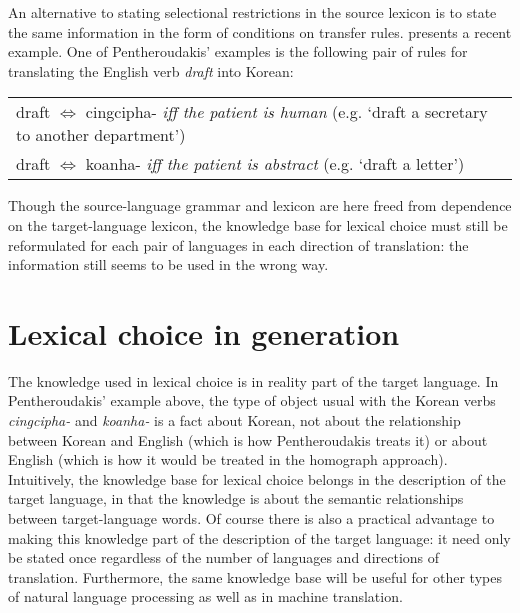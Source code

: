 An alternative to stating selectional restrictions in the source lexicon is
to state the same information in the form of conditions on transfer rules.
\cite{pentheroudakis:90:a} presents a recent example.
One of Pentheroudakis'
examples is the following pair of rules for translating the English verb
{\it draft\/} into Korean:
\begin{flushleft}
  \quad
  \small
  \begin{tabular}{l}
    draft $\Leftrightarrow$ cingcipha- {\it iff the patient is human\/}
    (e.g. `draft a secretary to another department')\\
    draft $\Leftrightarrow$ koanha- {\it iff the patient is abstract\/}
    (e.g. `draft a letter')\\
  \end{tabular}
\end{flushleft}
Though the source-language grammar and lexicon are here freed from dependence
on the target-language lexicon, the knowledge base for lexical choice must
still be reformulated for each pair of languages in each direction of
translation: the information still seems to be used in the wrong way.

\section{Lexical choice in generation}

The knowledge used in lexical choice is in reality part of the target
language. In Pentheroudakis' example above, the type of object usual with
the Korean verbs
{\it cingcipha-\/}
and
{\it koanha-\/}
is a fact about Korean, not about the relationship between Korean and English
(which is how Pentheroudakis treats it) or about English (which is how it
would be treated in the homograph approach). Intuitively, the knowledge
base for
lexical choice belongs in the description of the target language, in that
the knowledge is about the semantic relationships between target-language
words. Of course there is also a practical advantage to making this
knowledge part of the description of the target language: it need only be
stated once regardless of the number of languages and directions of
translation. Furthermore, the same knowledge base will be useful for
other types of natural language processing as well as in machine translation.

